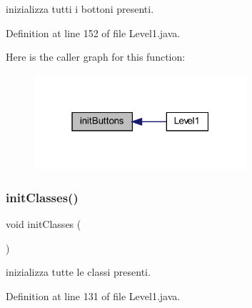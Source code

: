 inizializza tutti i bottoni presenti. 



Definition at line 152 of file Level1.\+java.

Here is the caller graph for this function\+:\nopagebreak
\begin{figure}[H]
\begin{center}
\leavevmode
\includegraphics[width=223pt]{classscenes_1_1_level1_a27d3ba5afb772cc36c9a432c28975ace_icgraph}
\end{center}
\end{figure}
\mbox{\label{classscenes_1_1_level1_afe125d345675ffefe8da7e96d39773f3}} 
\subsubsection{\texorpdfstring{init\+Classes()}{initClasses()}}
{\footnotesize\ttfamily void init\+Classes (\begin{DoxyParamCaption}{ }\end{DoxyParamCaption})}



inizializza tutte le classi presenti. 



Definition at line 131 of file Level1.\+java.

